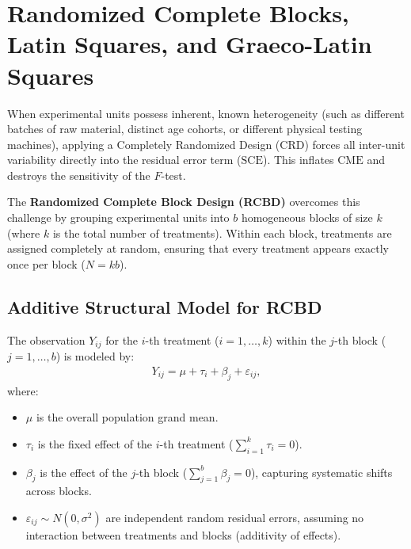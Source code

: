 \section{Randomized Complete Blocks, Latin Squares, and Graeco-Latin Squares}

When experimental units possess inherent, known heterogeneity (such as different batches of raw material, distinct age cohorts, or different physical testing machines), applying a Completely Randomized Design (CRD) forces all inter-unit variability directly into the residual error term ($\text{SCE}$). This inflates $\text{CME}$ and destroys the sensitivity of the $F$-test.

The \textbf{Randomized Complete Block Design (RCBD)} overcomes this challenge by grouping experimental units into $b$ homogeneous blocks of size $k$ (where $k$ is the total number of treatments). Within each block, treatments are assigned completely at random, ensuring that every treatment appears exactly once per block ($N = kb$).

\subsection{Additive Structural Model for RCBD}
The observation $Y_{ij}$ for the $i$-th treatment ($i=1,\dots,k$) within the $j$-th block ($j=1,\dots,b$) is modeled by:
\begin{align}
	Y_{ij} = \mu + \tau_i + \beta_j + \varepsilon_{ij},
	\label{eq:modelo_dbca}
\end{align}
where:
\begin{itemize}
	\item $\mu$ is the overall population grand mean.
	\item $\tau_i$ is the fixed effect of the $i$-th treatment ($\sum_{i=1}^k \tau_i = 0$).
	\item $\beta_j$ is the effect of the $j$-th block ($\sum_{j=1}^b \beta_j = 0$), capturing systematic shifts across blocks.
	\item $\varepsilon_{ij} \sim N(0, \sigma^2)$ are independent random residual errors, assuming no interaction between treatments and blocks (additivity of effects).
\end{itemize}

